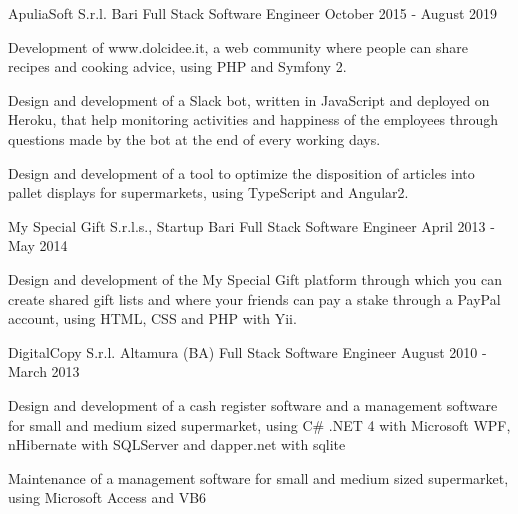 \documentclass{resume} %
\begin{document}
\cvEntry
  {ApuliaSoft S.r.l.}
  {Bari}
  {Full Stack Software Engineer}
  {October 2015 - August 2019}{
    \begin{cvEntryItems}
      \item Development of www.dolcidee.it, a web community where people can share recipes
            and cooking advice, using PHP and Symfony 2.
      \item Design and development of a Slack bot, written in JavaScript and deployed on
            Heroku, that help monitoring activities and happiness of the employees through
            questions made by the bot at the end of every working days.
      \item Design and development of a tool to optimize the disposition of articles into
            pallet displays for supermarkets, using TypeScript and Angular2.
    \end{cvEntryItems}
  }


\cvEntry
  {My Special Gift S.r.l.s., Startup}
  {Bari}
  {Full Stack Software Engineer}
  {April 2013 - May 2014}{
    \begin{cvEntryItems}
      \item Design and development of the My Special Gift platform through which you can
            create shared gift lists and where your friends can pay a stake through a
            PayPal account, using HTML, CSS and PHP with Yii.
    \end{cvEntryItems}
  }


\cvEntry
  {DigitalCopy S.r.l.}
  {Altamura (BA)}
  {Full Stack Software Engineer}
  {August 2010 - March 2013}{
    \begin{cvEntryItems}
      \item Design and development of a cash register software and a management software for
            small and medium sized supermarket, using C\# .NET 4 with Microsoft WPF, nHibernate
            with SQLServer and dapper.net with sqlite
      \item Maintenance of a management software for small and medium sized supermarket, using
            Microsoft Access and VB6
    \end{cvEntryItems}
  }

\end{document}
